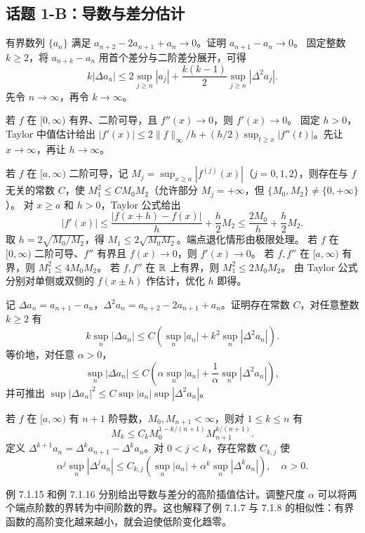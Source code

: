 \subsection*{话题 1-B：导数与差分估计}
有界数列 $\{a_n\}$ 满足 $a_{n+2}-2a_{n+1}+a_n\to0$。证明 $a_{n+1}-a_n\to0$。
\pf 固定整数 $k\ge2$，将 $a_{n+k}-a_n$ 用首个差分与二阶差分展开，可得
\[k|\Delta a_n|\le 2\sup_{j\ge n}|a_j|+\frac{k(k-1)}2\sup_{j\ge n}|\Delta^2a_j|.\]
先令 $n\to\infty$，再令 $k\to\infty$。

若 $f$ 在 $[0,\infty)$ 有界、二阶可导，且 $f''(x)\to0$，则 $f'(x)\to0$。
\pf 固定 $h>0$，Taylor 中值估计给出 $|f'(x)|\le 2\|f\|_\infty/h+(h/2)\sup_{t\ge x}|f''(t)|$。先让 $x\to\infty$，再让 $h\to\infty$。

若 $f$ 在 $[a,\infty)$ 二阶可导，记 $M_j=\sup_{x\ge a}|f^{(j)}(x)|$（$j=0,1,2$），则存在与 $f$ 无关的常数 $C$，使 $M_1^2\le CM_0M_2$（允许部分 $M_j=+\infty$，但 $\{M_0,M_2\}\ne\{0,+\infty\}$）。
\pf 对 $x\ge a$ 和 $h>0$，Taylor 公式给出
\[|f'(x)|\le \frac{|f(x+h)-f(x)|}{h}+\frac h2M_2\le\frac{2M_0}{h}+\frac h2M_2.\]
取 $h=2\sqrt{M_0/M_2}$，得 $M_1\le2\sqrt{M_0M_2}$。端点退化情形由极限处理。
若 $f$ 在 $[0,\infty)$ 二阶可导、$f''$ 有界且 $f(x)\to0$，则 $f'(x)\to0$。
若 $f,f''$ 在 $[a,\infty)$ 有界，则 $M_1^2\le4M_0M_2$。
若 $f,f''$ 在 $\mathbb R$ 上有界，则 $M_1^2\le2M_0M_2$。
\pf 由 Taylor 公式分别对单侧或双侧的 $f(x\pm h)$ 作估计，优化 $h$ 即得。

记 $\Delta a_n=a_{n+1}-a_n$，$\Delta^2a_n=a_{n+2}-2a_{n+1}+a_n$。证明存在常数 $C$，对任意整数 $k\ge2$ 有
\[k\sup_n|\Delta a_n|\le C\left(\sup_n|a_n|+k^2\sup_n|\Delta^2a_n|\right).\]
等价地，对任意 $\alpha>0$，
\[\sup_n|\Delta a_n|\le C\left(\alpha\sup_n|a_n|+\frac1\alpha\sup_n|\Delta^2a_n|\right),\]
并可推出 $\sup|\Delta a_n|^2\le C\sup|a_n|\sup|\Delta^2a_n|$。

若 $f$ 在 $[a,\infty)$ 有 $n+1$ 阶导数，$M_0,M_{n+1}<\infty$，则对 $1\le k\le n$ 有
\[M_k\le C_k M_0^{1-k/(n+1)}M_{n+1}^{k/(n+1)}.\]
定义 $\Delta^{k+1}a_n=\Delta^ka_{n+1}-\Delta^ka_n$。对 $0<j<k$，存在常数 $C_{k,j}$ 使
\[\alpha^j\sup_n|\Delta^ja_n|\le C_{k,j}\left(\sup_n|a_n|+\alpha^k\sup_n|\Delta^ka_n|\right),\quad\alpha>0.\]
\par 例 7.1.15 和例 7.1.16 分别给出导数与差分的高阶插值估计。调整尺度 $\alpha$ 可以将两个端点阶数的界转为中间阶数的界。这也解释了例 7.1.7 与 7.1.8 的相似性：有界函数的高阶变化越来越小，就会迫使低阶变化趋零。


